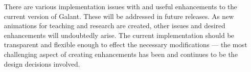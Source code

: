 There are various implementation issues with and useful enhancements
to the current version of Galant.
These will be addressed in future releases.
As new animations for teaching and research
are created, other issues and desired enhancements
will undoubtedly arise.
The current implementation should be transparent and flexible enough to effect the necessary modifications --- the most challenging aspect
of creating enhancements has been and continues to be the design decisions involved.

